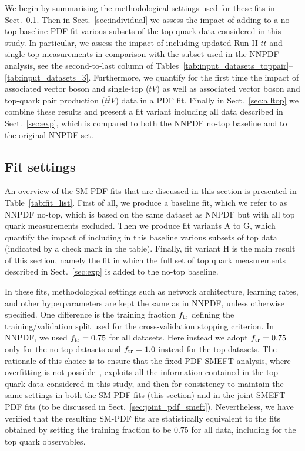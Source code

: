 \documentclass[withindex,glossary]{cam-thesis}
\begin{document}
We begin by summarising the methodological settings used for these
fits in Sect.~\ref{sec:setting}.
%
Then in Sect.~\ref{sec:individual} we assess the impact of adding to
a no-top baseline PDF fit various subsets of the top quark data
considered in this study. 
%
In particular, we assess the impact of including updated Run II $t\bar{t}$
and single-top measurements in comparison
with the subset used in the NNPDF analysis, see the second-to-last
column of Tables~\ref{tab:input_datasets_toppair}--
\ref{tab:input_datasets_3}.
%
Furthermore, we quantify for the first time the impact of
associated vector boson and single-top ($tV$) as well as associated vector boson and
top-quark pair production ($t \bar{t} V$) data in a PDF fit.
%
Finally in Sect.~\ref{sec:alltop} we combine these results and present a
fit variant including all data described in Sect.~\ref{sec:exp},
which is compared to both the NNPDF no-top baseline and to the original
NNPDF set.

\subsection{Fit settings}
\label{sec:setting}

An overview of the SM-PDF fits that are discussed in this section is
presented in Table~\ref{tab:fit_list}. 
%
First of all, we produce a baseline fit, which we refer to 
as NNPDF no-top, which is based on the same dataset as NNPDF
but with all top quark measurements excluded.
%
Then we produce fit variants A to G, which quantify the impact of
including in this baseline various subsets of
top data (indicated by a check mark in the table).
%
Finally, fit variant H is the main result of this section, namely the fit
in which the full set of top quark measurements described in
Sect.~\ref{sec:exp} is added to the no-top baseline.

In these fits, methodological settings such as network architecture,
learning rates, and other hyperparameters are kept the same as in
NNPDF, unless otherwise specified.
One difference is the training fraction $f_{\rm tr}$ defining
the training/validation split used for the cross-validation stopping criterion.
 In NNPDF, we used $f_{\rm tr}=0.75$  for all datasets.
 Here instead we adopt $f_{\rm tr}=0.75$ only for the no-top datasets
 and $f_{\rm tr}=1.0$ instead for the top datasets.
 The rationale of this choice is to ensure that the fixed-PDF 
 SMEFT analysis, where overfitting is not possible~\cite{Ethier:2021bye},
 exploits all the information contained in the top quark data considered
 in this study,  and then for consistency to maintain the same settings in
 both the SM-PDF fits (this section) and
 in the joint SMEFT-PDF fits (to be discussed in Sect.~\ref{sec:joint_pdf_smeft}).
%
 Nevertheless, we have verified that the resulting SM-PDF fits are statistically equivalent to the fits obtained by setting the training fraction to be $0.75$ for all data, including for the top quark observables.
\end{document}
